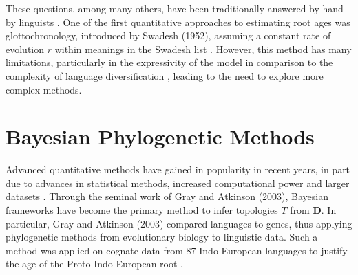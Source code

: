 These questions, among many others, have been traditionally answered by hand by linguists \cite{Pellard2015}. One of the first quantitative approaches to estimating root ages was glottochronology, introduced by Swadesh (1952), assuming a constant rate of evolution $r$ within meanings in the Swadesh list \cite{Swadesh1952}. However, this method has many limitations, particularly in the expressivity of the model in comparison to the complexity of language diversification \cite{Bergsland1962, Steel1988}, leading to the need to explore more complex methods.


\section{Bayesian Phylogenetic Methods}
\label{sec:bayesianphylomethods}
Advanced quantitative methods have gained in popularity in recent years, in part due to advances in statistical methods, increased computational power and larger datasets \cite{Bhattacharya2018}. Through the seminal work of Gray and Atkinson (2003), Bayesian frameworks have become the primary method to infer topologies $T$ from $\mathbf{D}$. In particular, Gray and Atkinson (2003) compared languages to genes, thus applying phylogenetic methods from evolutionary biology to linguistic data. 
Such a method was applied on cognate data from 87 Indo-European languages to justify the age of the Proto-Indo-European root \cite{Gray2003}. 

